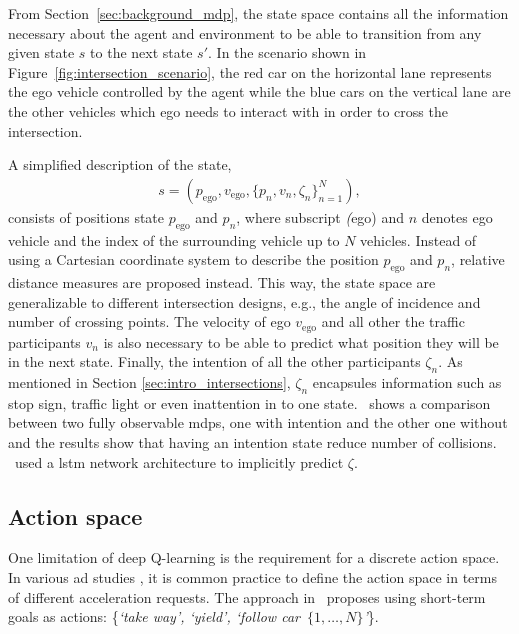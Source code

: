 From Section~\ref{sec:background_mdp}, the state space contains all the information necessary about the agent and environment to be able to transition from any given state $s$ to the next state $s'$. In the scenario shown in Figure~\ref{fig:intersection_scenario}, the red car on the horizontal lane represents the ego vehicle controlled by the agent while the blue cars on the vertical lane are the other vehicles which ego needs to interact with in order to cross the intersection. 

A simplified description of the state, 
\begin{align}
	s = (p_\mathrm{ego}, v_\mathrm{ego}, \{p_{n}, v_n, \zeta_n\}_{n=1}^N), 
	\label{eq:state}
\end{align}
consists of positions state $p_\mathrm{ego}$ and $p_n$, where subscript \textit(ego) and $n$ denotes ego vehicle and the index of the surrounding vehicle up to $N$ vehicles. 
Instead of using a Cartesian coordinate system to describe the position $p_\mathrm{ego}$ and $p_n$, relative distance measures are proposed instead. This way, the state space are generalizable to different intersection designs, e.g., the angle of incidence and number of crossing points. 
The velocity of ego $v_\mathrm{ego}$ and all other the traffic participants $v_n$ is also necessary to be able to predict what position they will be in the next state. Finally, the intention of all the other participants $\zeta_n$. As mentioned in Section \ref{sec:intro_intersections}, $\zeta_n$ encapsules information such as stop sign, traffic light or even inattention in to one state. 
\paperBelief \ shows a comparison between two fully observable \gls{mdp}s, one with intention and the other one without and the results show that having an intention state reduce number of collisions. 
\paperLSTM \ used a \gls{lstm} network architecture to implicitly predict $\zeta$. %

\subsection{Action space}
\label{sec:pomdp_actionspace}
One limitation of deep Q-learning is the requirement for a discrete action space. In various \gls{ad} studies \cite{bouton2019}, it is common practice to define the action space in terms of different acceleration requests. The approach in \paperLSTM \ proposes using short-term goals as actions: \{\textit{`take way', `yield', `follow car~$\{1, \dots , N\}$'}\}.


